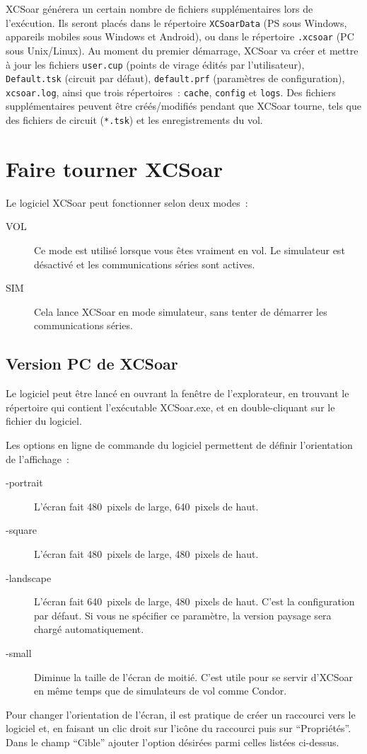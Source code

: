 XCSoar générera un certain nombre de fichiers supplémentaires lors de l'exécution. Ils
seront placés dans le répertoire \texttt{XCSoarData} (PS sous Windows, 
appareils mobiles sous Windows et Android), ou dans le répertoire \texttt{.xcsoar} (PC sous
Unix/Linux). Au moment du premier démarrage, XCSoar va créer et mettre à jour les fichiers
\texttt{user.cup} (points de virage édités par l'utilisateur),
\texttt{Default.tsk} (circuit par défaut), 
\texttt{default.prf} 
(paramètres de configuration),
\texttt{xcsoar.log}, 
ainsi que trois répertoires~: \texttt{cache},
\texttt{config} et \texttt{logs}. Des fichiers supplémentaires peuvent être 
créés/modifiés pendant que XCSoar tourne, tels que des fichiers de circuit
(\texttt{*.tsk}) et les enregistrements du vol.


\section{Faire tourner XCSoar}

Le logiciel XCSoar peut fonctionner selon deux modes~:
\begin{description}
\item[VOL] Ce mode est utilisé lorsque vous êtes vraiment en vol. Le simulateur est
 désactivé et les communications séries sont actives. 
\item[SIM] Cela lance XCSoar en mode simulateur, sans tenter de démarrer
 les communications séries.
\end{description}

\subsection*{Version PC de XCSoar}
Le logiciel peut être lancé en ouvrant la fenêtre de l'explorateur, en trouvant le répertoire
qui contient l'exécutable XCSoar.exe, et en double-cliquant sur le fichier du logiciel.

Les options en ligne de commande du logiciel permettent de définir
l'orientation de l'affichage~:
\begin{description}
\item[-portrait] L'écran fait 480~pixels de large, 640~pixels de haut.
\item[-square] L'écran fait 480~pixels de large, 480~pixels de haut.
\item[-landscape] L'écran fait 640~pixels de large, 480~pixels de haut. C'est la 
configuration par défaut. Si vous ne spécifier ce paramètre, la version paysage sera
chargé automatiquement.
\item[-small] Diminue la taille de l'écran de moitié. C'est utile pour se servir d'XCSoar en
même temps que de simulateurs de vol comme Condor.
\end{description}
Pour changer l'orientation de l'écran, il est pratique de créer un raccourci vers le
logiciel et, en faisant un clic droit sur l'icône du raccourci puis sur ``Propriétés''.
Dans le champ ``Cible'' ajouter l'option désirées parmi celles listées ci-dessus.

